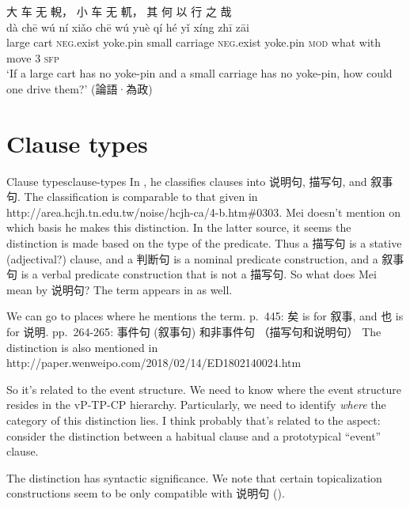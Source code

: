 \documentclass[UTF8, a4paper, oneside, scheme=plain, 12pt]{ctexrep}
\newcommand*{\citepage}[1]{p.~{#1}}
\newcommand*{\citepages}[1]{pp.~{#1}}
\newcommand{\translate}[1]{`#1'}
\newcommand*{\category}[1]{\textsc{#1}}
\begin{document}
\begin{exe}
    \ex\label{ex:grammatical.clause.sfp.interrogative.1}
    \glll 大 车 无 輗， 小 车 无 軏， 其 何 以 行 之 哉 \\
    dà chē wú ní xiǎo chē wú yuè qí hé yǐ xíng zhī zāi \\
    large cart \category{neg}.exist yoke.pin small carriage \category{neg}.exist yoke.pin \category{mod} what with move 3 \category{sfp} \\
    \glt\translate{If a large cart has no yoke-pin and a small carriage has no yoke-pin, how could one drive them?} \hfill (論語·為政)
\end{exe}

\chapter{Clause types}

\begin{todobox}{Clause types}{clause-types}
    In \citet[\citepage{131}]{meiguang2018},
    he classifies clauses into 说明句, 描写句, and 叙事句.
    The classification is comparable to that given in http://area.hcjh.tn.edu.tw/noise/hcjh-ca/4-b.htm\#0303.
    Mei doesn't mention on which basis he makes this distinction.
    In the latter source, it seems the distinction is made based on the type of the predicate.
    Thus a 描写句 is a stative (adjectival?) clause,
    and a 判断句 is a nominal predicate construction,
    and a 叙事句 is a verbal predicate construction that is not a 描写句.
    So what does Mei mean by 说明句?
    The term appears in \citet{li2004grammar} as well.


    We can go to places where he mentions the term.
    \citepage{445}: 矣 is for 叙事, and 也 is for 说明.
    \citepages{264-265}: 事件句 (叙事句) 和非事件句 （描写句和说明句）
    The distinction is also mentioned in http://paper.wenweipo.com/2018/02/14/ED1802140024.htm
    
    So it's related to the event structure.
    We need to know where the event structure resides in the vP-TP-CP hierarchy.
    Particularly, we need to identify \emph{where} the category of this distinction lies.
    I think probably that's related to the aspect:
    consider the distinction between a habitual clause and a prototypical ``event'' clause.
    
    The distinction has syntactic significance.
    We note that certain topicalization constructions seem to be only compatible with 说明句
    ().
\end{todobox}
\end{document}
